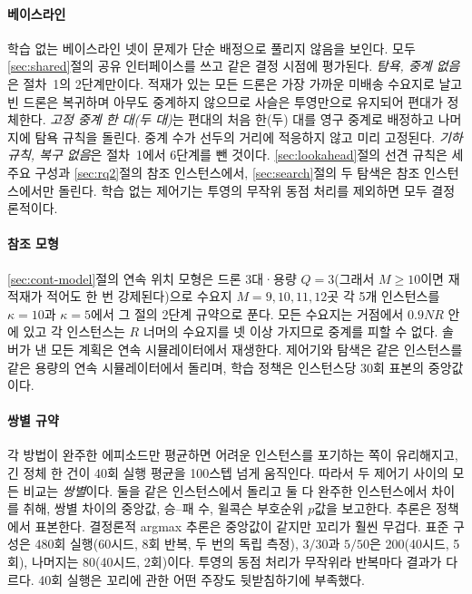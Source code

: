 \documentclass[final,5p,times,twocolumn]{elsarticle}
\begin{document}
\paragraph{베이스라인}
학습 없는 베이스라인 넷이 문제가 단순 배정으로 풀리지 않음을 보인다. 모두 \ref{sec:shared}절의
공유 인터페이스를 쓰고 같은 결정 시점에 평가된다. \emph{탐욕, 중계 없음}은 절차~1의 2단계만이다.
적재가 있는 모든 드론은 가장 가까운 미배송 수요지로 날고 빈 드론은 복귀하며 아무도 중계하지
않으므로 사슬은 투영만으로 유지되어 편대가 정체한다. \emph{고정 중계 한 대(두 대)}는 편대의 처음
한(두) 대를 영구 중계로 배정하고 나머지에 탐욕 규칙을 돌린다. 중계 수가 선두의 거리에 적응하지
않고 미리 고정된다. \emph{기하 규칙, 복구 없음}은 절차~1에서 6단계를 뺀 것이다. \ref{sec:lookahead}절의 선견 규칙은
세 주요 구성과 \ref{sec:rq2}절의 참조 인스턴스에서, \ref{sec:search}절의 두 탐색은 참조 인스턴스에서만
돌린다. 학습 없는 제어기는 투영의 무작위 동점 처리를 제외하면 모두 결정론적이다.

\paragraph{참조 모형}
\ref{sec:cont-model}절의 연속 위치 모형은
드론 3대·용량 $Q = 3$(그래서 $M \ge 10$이면 재적재가 적어도 한 번 강제된다)으로 수요지
$M = 9, 10, 11, 12$곳 각 5개 인스턴스를 $\kappa = 10$과 $\kappa = 5$에서 그 절의 2단계 규약으로 푼다.
모든 수요지는 거점에서 $0.9NR$ 안에 있고 각 인스턴스는 $R$ 너머의 수요지를 넷 이상 가지므로 중계를
피할 수 없다. 솔버가 낸 모든 계획은 연속 시뮬레이터에서 재생한다. 제어기와 탐색은 같은
인스턴스를 같은 용량의 연속 시뮬레이터에서 돌리며, 학습 정책은 인스턴스당 30회 표본의 중앙값이다.

\paragraph{쌍별 규약}
각 방법이 완주한 에피소드만 평균하면 어려운 인스턴스를 포기하는 쪽이 유리해지고, 긴 정체 한 건이
40회 실행 평균을 100스텝 넘게 움직인다. 따라서 두 제어기 사이의 모든 비교는 \emph{쌍별}이다. 둘을
같은 인스턴스에서 돌리고 둘 다 완주한 인스턴스에서 차이를 취해, 쌍별 차이의 중앙값, 승--패 수,
윌콕슨 부호순위 $p$값을 보고한다. 추론은 정책에서 표본한다. 결정론적 argmax 추론은 중앙값이 같지만
꼬리가 훨씬 무겁다. 표준 구성은 480회 실행(60시드, 8회 반복, 두 번의 독립 측정), $3/30$과 $5/50$은
200(40시드, 5회), 나머지는 80(40시드, 2회)이다. 투영의 동점 처리가 무작위라 반복마다 결과가
다르다. 40회 실행은 꼬리에 관한 어떤 주장도 뒷받침하기에 부족했다.
\end{document}
